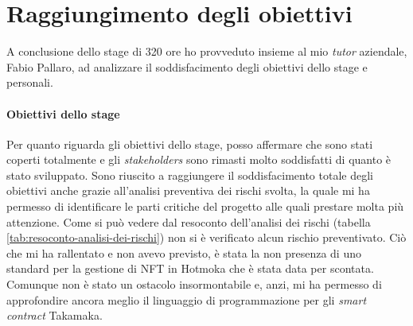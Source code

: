 
\section{Raggiungimento degli obiettivi}
A conclusione dello stage di 320 ore ho provveduto insieme al mio \textit{tutor} aziendale, Fabio Pallaro, ad analizzare il soddisfacimento degli obiettivi dello stage e personali.

\paragraph{Obiettivi dello stage}
Per quanto riguarda gli obiettivi dello stage, posso affermare che sono stati coperti totalmente e gli \textit{stakeholders} sono rimasti molto soddisfatti di quanto è stato sviluppato. 
Sono riuscito a raggiungere il soddisfacimento totale degli obiettivi anche grazie all'analisi preventiva dei rischi svolta, la quale mi ha permesso di identificare le parti critiche del progetto alle quali prestare molta più attenzione. 
Come si può vedere dal resoconto dell'analisi dei rischi (tabella \ref{tab:resoconto-analisi-dei-rischi}) non si è verificato alcun rischio preventivato. 
Ciò che mi ha rallentato e non avevo previsto, è stata la non presenza di uno standard per la gestione di NFT in Hotmoka che è stata data per scontata. Comunque non è stato un ostacolo insormontabile e, anzi, mi ha permesso di approfondire ancora meglio il linguaggio di programmazione per gli \textit{smart contract} Takamaka.

